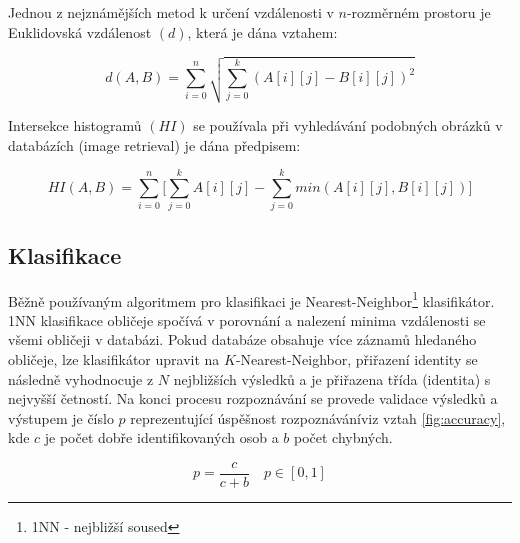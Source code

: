 \documentclass[czech,BP]{thesiskiv}
\begin{document}
Jednou z nejznámějších metod k určení vzdálenosti v $n$-rozměrném prostoru je Euklidovská vzdálenost $(d)$, která je dána vztahem:

\begin{equation} \label{fig:euclidean}
d(A,B)=\sum_{i=0}^{n}{\sqrt{
\sum_{j=0}^{k}{(
A[i][j]-B[i][j])^2}}}
\end{equation}

Intersekce histogramů $(HI)$ se používala při vyhledávání podobných obrázků v databázích (image retrieval) je dána předpisem:

\begin{equation} \label{fig:histogram_intersection}
HI(A,B)=\sum_{i=0}^{n}{\Bigg[
\sum_{j=0}^{k}{A[i][j]}
-
\sum_{j=0}^{k}{
min(A[i][j],B[i][j])}
\Bigg]
}
\end{equation}

\subsection{Klasifikace}

Běžně používaným algoritmem pro klasifikaci je Nearest-Neighbor\footnote{1NN - nejbližší soused} klasifikátor. 1NN klasifikace obličeje spočívá v  porovnání a nalezení minima vzdálenosti se všemi obličeji v databázi. Pokud databáze obsahuje více záznamů hledaného obličeje, lze klasifikátor upravit na $K$-Nearest-Neighbor, přiřazení identity se následně vyhodnocuje z $N$ nejbližších výsledků a je přiřazena třída (identita) s nejvyšší četností. Na konci procesu rozpoznávání se provede validace výsledků a výstupem je číslo $p$ reprezentující úspěšnost rozpoznáváníviz vztah \ref{fig:accuracy}, kde $c$ je počet dobře identifikovaných osob a $b$ počet chybných.

\begin{equation} \label{fig:accuracy}
p=\dfrac{c}{c+b}\quad p \in [0,1]
\end{equation}
\end{document}
